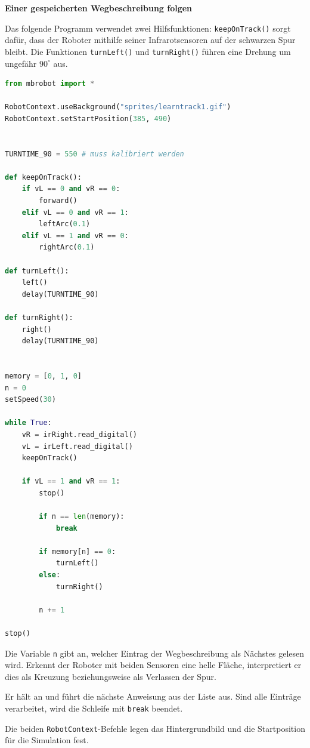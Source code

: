 \begin{myexample}
    \textbf{Einer gespeicherten Wegbeschreibung folgen}

    Das folgende Programm verwendet zwei Hilfsfunktionen:
    \texttt{keepOnTrack()} sorgt dafür, dass der Roboter
    mithilfe seiner Infrarotsensoren auf der schwarzen
    Spur bleibt. Die Funktionen \texttt{turnLeft()} und
    \texttt{turnRight()} führen eine Drehung um ungefähr
    \(90^\circ\) aus.

    \begin{lstlisting}[language=Python]
from mbrobot import *

RobotContext.useBackground("sprites/learntrack1.gif")
RobotContext.setStartPosition(385, 490)


TURNTIME_90 = 550 # muss kalibriert werden

def keepOnTrack():
    if vL == 0 and vR == 0:
        forward()
    elif vL == 0 and vR == 1:
        leftArc(0.1)
    elif vL == 1 and vR == 0:
        rightArc(0.1)
        
def turnLeft():
    left()
    delay(TURNTIME_90)

def turnRight():
    right()
    delay(TURNTIME_90)    
 

memory = [0, 1, 0]
n = 0
setSpeed(30)

while True:
    vR = irRight.read_digital()
    vL = irLeft.read_digital()
    keepOnTrack()

    if vL == 1 and vR == 1:
        stop()

        if n == len(memory):
            break

        if memory[n] == 0:
            turnLeft()
        else:
            turnRight()

        n += 1

stop()
    \end{lstlisting}

    Die Variable \texttt{n} gibt an, welcher Eintrag
    der Wegbeschreibung als Nächstes gelesen wird.
    Erkennt der Roboter mit beiden Sensoren eine
    helle Fläche, interpretiert er dies als Kreuzung
    beziehungsweise als Verlassen der Spur.

    Er hält an und führt die nächste Anweisung aus
    der Liste aus. Sind alle Einträge verarbeitet,
    wird die Schleife mit \texttt{break} beendet.

    Die beiden \texttt{RobotContext}-Befehle legen
    das Hintergrundbild und die Startposition
    für die Simulation fest.
\end{myexample}


